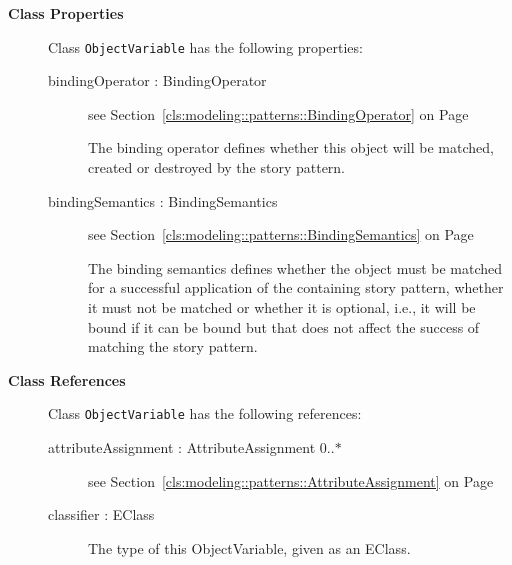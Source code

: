 \begin{description}

	\item[\textbf{Class Properties}] Class \texttt{ObjectVariable} has the following properties:
	\begin{description}
\item[bindingOperator : BindingOperator 	]
see Section~\ref{cls:modeling::patterns::BindingOperator} on Page~\pageref{cls:modeling::patterns::BindingOperator}\hspace{\fill}
\nopagebreak


	
			
The binding operator defines whether this object will be matched, created or destroyed by the story pattern.	
		
	
\item[bindingSemantics : BindingSemantics 	]
see Section~\ref{cls:modeling::patterns::BindingSemantics} on Page~\pageref{cls:modeling::patterns::BindingSemantics}\hspace{\fill}
\nopagebreak


	
			
The binding semantics defines whether the object must be matched for a successful application of the containing story pattern, whether it must not be matched or whether it is optional, i.e., it will be bound if it can be bound but that does not affect the success of matching the story pattern.	
		
	
	\end{description}
	
	\item[\textbf{Class References}] Class \texttt{ObjectVariable} has the following references:
	\begin{description}
\item[attributeAssignment : AttributeAssignment 			0..$*$]
see Section~\ref{cls:modeling::patterns::AttributeAssignment} on Page~\pageref{cls:modeling::patterns::AttributeAssignment}\hspace{\fill}
\nopagebreak


	
\item[classifier : EClass 	]
\hspace{\fill}
\nopagebreak


	
			
The type of this ObjectVariable, given as an EClass.	
			
	
		

\end{description}
\end{description}

